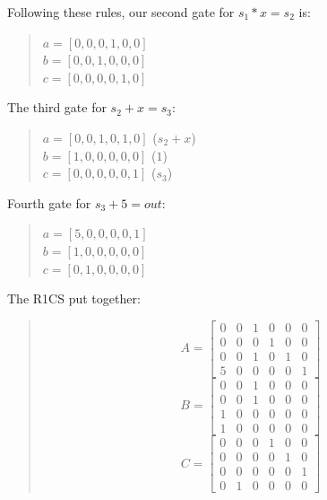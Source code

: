 Following these rules, our second gate for $s_1*x=s_2$ is:
\begin{quote}
   $a = [0,0,0,1,0,0]$
   \\
   $b = [0,0,1,0,0,0]$
   \\
   $c = [0,0,0,0,1,0]$
\end{quote}

The third gate for $s_2+x=s_3$:
\begin{quote}
   $a = [0,0,1,0,1,0]$ ($s_2+x$)
   \\
   $b = [1,0,0,0,0,0]$ ($1$)
   \\
   $c = [0,0,0,0,0,1]$ ($s_3$)
\end{quote}

Fourth gate for $s_3+5=out$:
\begin{quote}
   $a = [5,0,0,0,0,1]$
   \\
   $b = [1,0,0,0,0,0]$
   \\
   $c = [0,1,0,0,0,0]$
\end{quote}

The R1CS put together:
\begin{quote}
   \[
 A =
   \begin{bmatrix}
      0 & 0 & 1 & 0 & 0 & 0 \\
      0 & 0 & 0 & 1 & 0 & 0 \\
      0 & 0 & 1 & 0 & 1 & 0 \\
      5 & 0 & 0 & 0 & 0 & 1
   \end{bmatrix}
   \]
   \[
 B =
   \begin{bmatrix}
      0 & 0 & 1 & 0 & 0 & 0 \\
      0 & 0 & 1 & 0 & 0 & 0 \\
      1 & 0 & 0 & 0 & 0 & 0 \\
      1 & 0 & 0 & 0 & 0 & 0
   \end{bmatrix}
   \]
   \[
 C =
   \begin{bmatrix}
      0 & 0 & 0 & 1 & 0 & 0 \\
      0 & 0 & 0 & 0 & 1 & 0 \\
      0 & 0 & 0 & 0 & 0 & 1 \\
      0 & 1 & 0 & 0 & 0 & 0
   \end{bmatrix}
   \]
   \end{quote}
   
\cite{RC23}


